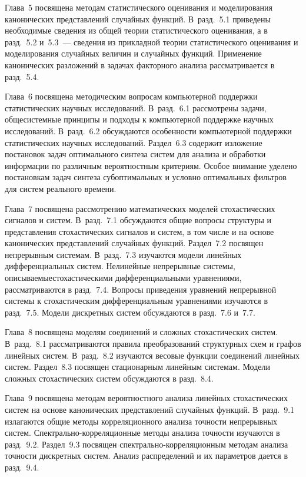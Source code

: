 \begin{multicols}{2}
{{      Глава~5 посвящена методам статистического оценивания и моделирования 
канонических представлений случайных функций. В~разд.~5.1 приведены 
необходимые сведения из общей теории статистического оценивания, а в разд.~5.2 
и~5.3~--- сведения из прикладной теории статистического оценивания и моделирования 
случайных величин и случайных функций. Применение канонических разложений в 
задачах факторного анализа рассматривается в разд.~5.4.

\def\leftkol{РЕЦЕНЗИИ}

\def\rightkol{РЕЦЕНЗИИ} 
      
      Глава~6 посвящена методическим вопросам компьютерной поддержки 
статистических научных исследований. В~разд.~6.1 рассмотрены задачи, 
общесистемные принципы и подходы к компьютерной поддержке научных исследований. 
В~разд.~6.2 обсуждаются особенности компьютерной поддержки статистических 
научных исследований. Раздел~6.3 содержит изложение постановок задач оптимального 
синтеза систем для анализа и обработки информации по различным вероятностным 
критериям. Особое внимание уделено постановкам задач синтеза субоптимальных и 
условно оптимальных фильт\-ров для систем реального времени.
      
      Глава~7 посвящена рассмотрению математических моделей стохастических 
сигналов и систем. В~разд.~7.1 обсуж\-да\-ют\-ся общие вопросы структуры и 
представления стохастических сигналов и систем, в том числе и на основе канонических 
представлений случайных функций. Раздел~7.2  посвящен непрерывным сис\-темам. 
В~разд.~7.3 изучаются модели линейных дифференциальных сис\-тем. Нелинейные 
непрерывные сис\-темы, опи\-сы\-ва\-емые\linebreak стохастическими дифференциальными уравнениями, 
рас\-смат\-ри\-ва\-ют\-ся в разд.~7.4. Вопросы приведения уравнений непрерывной системы к 
стохастическим дифференциальным уравнениями изучаются в разд.~7.5. Модели 
дискретных систем обсуждаются в разд.~7.6 и~7.7. 
      
      Глава~8  посвящена моделям соединений и сложных стохастических систем. 
В~разд.~8.1 рассматриваются правила преобразований структурных схем и графов 
линейных систем. В~разд.~8.2 изучаются весовые функции соединений линейных 
систем. Раздел~8.3 посвящен стационарным линейным системам. Модели сложных 
стохастических систем обсуждаются в разд.~8.4. 

\def\leftkol{РЕЦЕНЗИИ}

\def\rightkol{РЕЦЕНЗИИ} 
      
      Глава~9 посвящена методам вероятностного анализа линейных стохастических 
систем на основе канонических представлений случайных функций. В~разд.~9.1 
излагаются общие методы корреляционного анализа точности непрерывных сис\-тем. 
Спектрально-кор\-ре\-ля\-ци\-он\-ные методы анализа точности изучаются в разд.~9.2. 
Раздел~9.3 посвящен спектрально-кор\-ре\-ля\-ци\-он\-ным методам анализа точности 
дискретных систем. Анализ распределений и их параметров дается в разд.~9.4. 
      
}}
\end{multicols}
